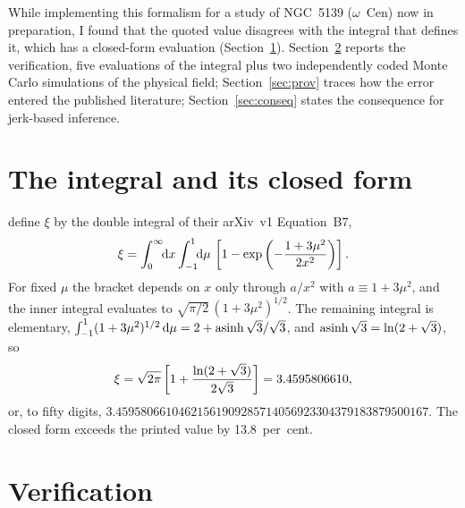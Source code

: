\documentclass[twocolumn]{aastex701}
\begin{document}
While implementing this formalism for a study of NGC~5139 ($\omega$~Cen) now in preparation, I found that the quoted value disagrees with the integral that defines it, which has a closed-form evaluation (Section~\ref{sec:value}). Section~\ref{sec:verify} reports the verification, five evaluations of the integral plus two independently coded Monte Carlo simulations of the physical field; Section~\ref{sec:prov} traces how the error entered the published literature; Section~\ref{sec:conseq} states the consequence for jerk-based inference.

\section{The integral and its closed form} \label{sec:value}

\citet{Prager2017} define $\xi$ by the double integral of their arXiv~v1 Equation~B7,
\begin{equation}
\xi=\int_0^{\infty}\!\!{\rm d}x\int_{-1}^{1}\!\!{\rm d}\mu\,\left[1-\exp\left(-{1+3\mu^{2}\over 2x^{2}}\right)\right].
\label{eq:xidef}
\end{equation}
For fixed $\mu$ the bracket depends on $x$ only through $a/x^{2}$ with $a\equiv1+3\mu^{2}$, and the inner integral evaluates to $\sqrt{\pi/2}\,(1+3\mu^{2})^{1/2}$. The remaining integral is elementary, $\int_{-1}^{1}(1+3\mu^{2})^{1/2}\,{\rm d}\mu=2+{\rm asinh}\,\sqrt{3}/\sqrt{3}$, and ${\rm asinh}\,\sqrt{3}=\ln(2+\sqrt{3})$, so
\begin{equation}
\xi=\sqrt{2\pi}\left[1+{\ln(2+\sqrt{3})\over 2\sqrt{3}}\right]=3.4595806610,
\label{eq:xi}
\end{equation}
or, to fifty digits, $3.4595\allowbreak8066\allowbreak1046\allowbreak2156\allowbreak1909\allowbreak2857\allowbreak1405\allowbreak6923\allowbreak3043\allowbreak7918\allowbreak3879\allowbreak5001\allowbreak67$. The closed form exceeds the printed value by 13.8~per~cent.

\section{Verification} \label{sec:verify}
\end{document}
